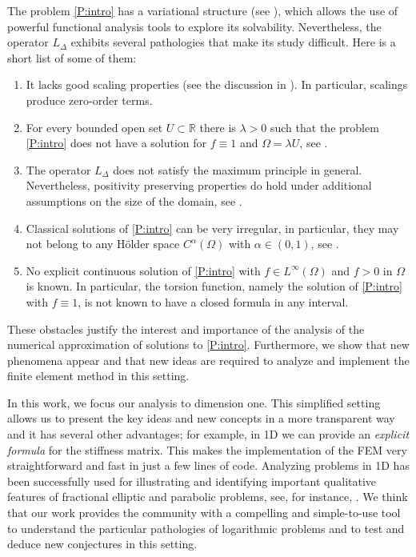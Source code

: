 \documentclass[10 pt]{article}
\numberwithin{equation}{section}
\def\R{\mathbb{R}}
\begin{document}
The problem \eqref{P:intro} has a variational structure (see \cite{CW19}), which allows the use of powerful functional analysis tools to explore its solvability. Nevertheless, the operator $L_\Delta$ exhibits several pathologies that make its study difficult. Here is a short list of some of them:
\begin{enumerate}
    \item It lacks good scaling properties (see the discussion in \cite{CS22}).  In particular, scalings produce zero-order terms. 
    \item For every bounded open set $U\subset \R$ there is $\lambda>0$ such that the problem \eqref{P:intro} does not have a solution for $f\equiv 1$ and $\Omega=\lambda U$, see \cite[Remark 5.9]{CS22}.
    \item The operator $L_\Delta$ does not satisfy the maximum principle in general. Nevertheless, positivity preserving properties do hold under additional assumptions on the size of the domain, see \cite[Theorem 1.8 and Corollary 1.9]{CW19}.
    \item Classical solutions of \eqref{P:intro} can be very irregular, in particular, they may not belong to any Hölder space $C^\alpha(\Omega)$ with $\alpha\in(0,1)$, see \cite[Remark 5.6]{CS22}.
    \item No explicit continuous solution of \eqref{P:intro} with $f\in L^\infty(\Omega)$ and $f>0$ in $\Omega$ is known. In particular, the torsion function, namely the solution of \eqref{P:intro} with $f\equiv 1$, is not known to have a closed formula in any interval.
\end{enumerate}

 These obstacles justify the interest and importance of the analysis of the numerical approximation of solutions to \eqref{P:intro}.  Furthermore, we show that new phenomena appear and that new ideas are required to analyze and implement the finite element method in this setting.

In this work, we focus our analysis to dimension one. This simplified setting allows us to present the key ideas and new concepts in a more transparent way and it has several other advantages; for example, in 1D we can provide an \emph{explicit formula} for the stiffness matrix.  This makes the implementation of the FEM very straightforward and fast in just a few lines of code.  Analyzing problems in 1D has been successfully used for illustrating and identifying important qualitative features of fractional elliptic and parabolic problems, see, for instance, \cite{ABBM18,BdPM18,BHS19,CGH20}. We think that our work provides the community with a compelling and simple-to-use tool to understand the particular pathologies of logarithmic problems and to test and deduce new conjectures in this setting.
\end{document}
